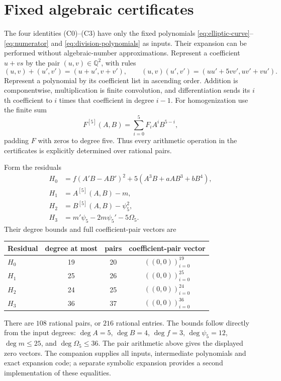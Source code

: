 \documentclass[11pt,a4paper]{article}
\theoremstyle{remark}
\newcommand{\Q}{\mathbb Q}
\begin{document}
\section{Fixed algebraic certificates}\label{app:isogeny}
The four identities (C0)--(C3) have only the fixed polynomials
\eqref{eq:elliptic-curve}--\eqref{eq:numerator} and
\eqref{eq:division-polynomials} as inputs. Their expansion can be
performed without algebraic-number approximations. Represent a
coefficient $u+vs$ by the pair $(u,v)\in\Q^2$, with rules
\[
 (u,v)+(u',v')=(u+u',v+v'),\qquad
 (u,v)(u',v')=(uu'+5vv',uv'+vu').
\]
Represent a polynomial by its coefficient list in ascending order.
Addition is componentwise, multiplication is finite convolution,
and differentiation sends its $i$th coefficient to $i$ times that
coefficient in degree $i-1$. For homogenization use the finite sum
\[
 F^{[5]}(A,B)=\sum_{i=0}^5 F_iA^iB^{5-i},
\]
padding $F$ with zeros to degree five. Thus every arithmetic operation
in the certificates is explicitly determined over rational pairs.

Form the residuals
\begin{align*}
 H_0&=f(A'B-AB')^2+5(A^3B+aAB^3+bB^4),\\
 H_1&=A^{[5]}(A,B)-m,\\
 H_2&=B^{[5]}(A,B)-\psi_5^2,\\
 H_3&=m'\psi_5-2m\psi_5'-5\Omega_5.
\end{align*}
Their degree bounds and full coefficient-pair vectors are
\begin{center}
\begin{tabular}{@{}lccc@{}}\toprule
Residual&degree at most&pairs&coefficient-pair vector\\\midrule
$H_0$&19&20&$((0,0))_{i=0}^{19}$\\
$H_1$&25&26&$((0,0))_{i=0}^{25}$\\
$H_2$&24&25&$((0,0))_{i=0}^{24}$\\
$H_3$&36&37&$((0,0))_{i=0}^{36}$\\\bottomrule
\end{tabular}
\end{center}
There are $108$ rational pairs, or $216$ rational entries.
The bounds follow directly from the input degrees: $\deg A=5$,
$\deg B=4$, $\deg f=3$, $\deg\psi_5=12$, $\deg m\le25$, and
$\deg\Omega_5\le36$. The pair arithmetic above gives the displayed
zero vectors. The companion supplies all inputs, intermediate
polynomials and exact expansion code; a separate symbolic expansion
provides a second implementation of these equalities.
\end{document}
